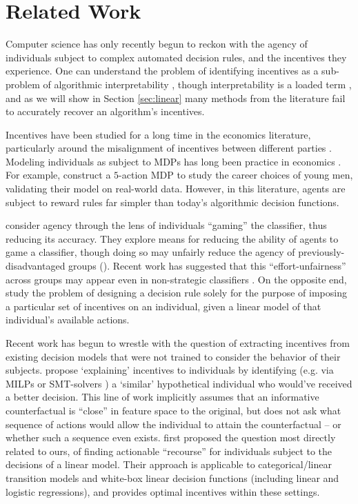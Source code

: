 \section{Related Work}
\label{sec:relatedwork}
Computer science has only recently begun to reckon with the agency of individuals subject to complex automated decision rules, and the incentives they experience. One can understand the problem of identifying incentives as a sub-problem of algorithmic interpretability \cite{guidotti2019survey, doshi2017towards}, though interpretability is a loaded term \cite{lipton2016mythos}, and as we will show in Section \ref{sec:linear} many methods from the literature fail to accurately recover an algorithm's incentives.

Incentives have been studied for a long time in the economics literature, particularly around the misalignment of incentives between different parties \cite{kerr1975folly, grossman1992analysis}. Modeling individuals as subject to MDPs has long been practice in economics \cite{rust1994structural}. For example, \citet{keane1997career} construct a $5$-action MDP to study the career choices of young men, validating their model on real-world data. However, in this literature, agents are subject to reward rules far simpler than today's algorithmic decision functions.

\citet{hardt2016strategic} consider agency through the lens of individuals ``gaming'' the classifier, thus reducing its accuracy. They explore means for reducing the ability of agents to game a classifier, though doing so may unfairly reduce the agency of previously-disadvantaged groups (\citet{milli2019social, hu2019disparate}). Recent work has suggested that this ``effort-unfairness'' across groups may appear even in non-strategic classifiers \cite{heidari2019long}.
On the opposite end, \citet{kleinberg2018classifiers} study the problem of designing a decision rule solely for the purpose of imposing a particular set of incentives on an individual, given a linear model of that individual's available actions.

Recent work has begun to wrestle with the question of extracting incentives from existing decision models that were not trained to consider the behavior of their subjects. \citet{wachter2017counterfactual} propose `explaining' incentives to individuals by identifying (e.g. via MILPs \cite{russell2019efficient} or SMT-solvers \cite{karimi2019model}) a `similar' hypothetical individual who would've received a better decision. This line of work implicitly assumes that an informative counterfactual is ``close'' in feature space to the original, but does not ask what sequence of actions would allow the individual to attain the counterfactual -- or whether such a sequence even exists. \citet{ustun2019actionable} first proposed the question most directly related to ours, of finding actionable ``recourse'' for individuals subject to the decisions of a linear model. Their approach is applicable to categorical/linear transition models and white-box linear decision functions (including linear and logistic regressions), and provides optimal incentives within these settings.

